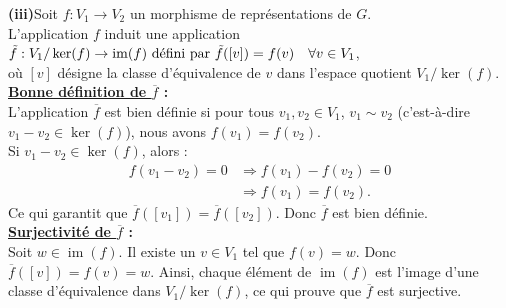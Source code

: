 \documentclass[a4paper, 14pt]{report}
\begin{document}
\begin{onehalfspace}
{			\textbf{(iii)}Soit \( f : V_1 \to V_2 \) un morphisme de représentations de \( G \).\\
			L'application \( f \) induit une application \\
			\( \tilde{f}: V_1 / \ker(f) \to \operatorname{im}(f)$ défini par $\tilde{f}([v]) = f(v) \quad \forall v \in V_1 \), \\
			où \( [v] \) désigne la classe d'équivalence de \( v \) dans l'espace quotient \( V_1 / \ker(f) \).\\
			
			\textbf{\underline{Bonne définition de \( \overline{f} \)} :}\\
			L'application \( \overline{f} \) est bien définie si pour tous \( v_1, v_2 \in V_1 \), \( v_1 \sim v_2 \) (c'est-à-dire \( v_1 - v_2 \in \ker(f) \)), nous avons \( f(v_1) = f(v_2) \).\\
			Si \( v_1 - v_2 \in \ker(f) \), alors :
			\[
			\begin{aligned}
				f(v_1-v_2)=0 & \Rightarrow f(v_1)-f(v_2)=0 \\
				&\Rightarrow f(v_1)=f(v_2).
			\end{aligned}
			\]
			Ce qui garantit que \( \overline{f}([v_1]) = \overline{f}([v_2]) \). Donc \( \overline{f} \) est bien définie.\\
			
			\textbf{\underline{Surjectivité de \( \overline{f} \)} :}\\
			Soit \( w \in \operatorname{im}(f) \). Il existe un \( v \in V_1 \) tel que \( f(v) = w \). Donc \( \overline{f}([v]) = f(v) = w \). Ainsi, chaque élément de \( \operatorname{im}(f) \) est l'image d'une classe d'équivalence dans \( V_1 / \ker(f) \), ce qui prouve que \( \overline{f} \) est surjective.\\
			
}
\end{onehalfspace}
\end{document}
